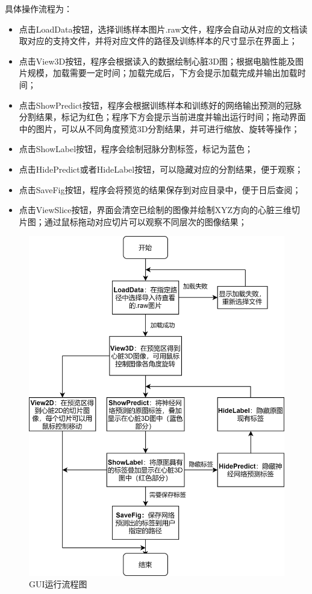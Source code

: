 \documentclass[lang=cn,11pt,a4paper,cite=numbers]{elegantpaper}
\begin{document}
具体操作流程为：

\begin{itemize}
    \item 点击LoadData按钮，选择训练样本图片.raw文件，程序会自动从对应的文档读取对应的支持文件，并将对应文件的路径及训练样本的尺寸显示在界面上；
    \item 点击View3D按钮，程序会根据读入的数据绘制心脏3D图；根据电脑性能及图片规模，加载需要一定时间；加载完成后，下方会提示加载完成并输出加载时间；
    \item 点击ShowPredict按钮，程序会根据训练样本和训练好的网络输出预测的冠脉分割结果，标记为红色；程序下方会提示当前进度并输出运行时间；拖动界面中的图片，可以从不同角度预览3D分割结果，并可进行缩放、旋转等操作；
    \item 点击ShowLabel按钮，程序会绘制冠脉分割标签，标记为蓝色；
    \item 点击HidePredict或者HideLabel按钮，可以隐藏对应的分割结果，便于观察；
    \item 点击SaveFig按钮，程序会将预览的结果保存到对应目录中，便于日后查阅；
    \item 点击ViewSlice按钮，界面会清空已绘制的图像并绘制XYZ方向的心脏三维切片图；通过鼠标拖动对应切片可以观察不同层次的图像结果；
\end{itemize}

\begin{figure}[H]
    \centering
    \includegraphics[scale=1]{./image/前期总结/GUIDiagram.png}
    \caption{GUI运行流程图}
    \label{fig:GUIDiagram}
\end{figure}
\end{document}
